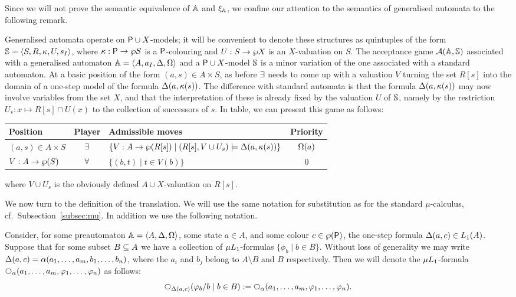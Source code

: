Since we will not prove the semantic equivalence of $\mathbb{A}$ and $\xi_{\mathbb{A}}$,
we confine our attention to the semantics of generalised automata to the
following remark.

\begin{remark}
Generalised automata operate on $\mathsf{P} \cup X$-models; it will be convenient to
denote these structures as quintuples of the form $\mathbb{S} = \langle{S,R,\kappa,U,
s_{I}}\rangle$, where $\kappa: \mathsf{P} \to \wp S$ is a $\mathsf{P}$-colouring and $U: S \to 
\wp X$ is an $X$-valuation on $S$.
The acceptance game $\mathcal{A}(\mathbb{A},\mathbb{S})$ associated with a generalised automaton
$\mathbb{A} = \langle{A,a_{I},\Delta,\Omega}\rangle$ and a $\mathsf{P} \cup X$-model $\mathbb{S}$ is a minor
variation of the one associated with a standard automaton.
At a basic position of the form $(a,s) \in A \times S$, as before $\exists$ 
needs to come up with a valuation $V$ turning the set $R[s]$ into the domain of 
a one-step model of the formula $\Delta(a,\kappa(s))$.
The difference with standard automata is that the formula $\Delta(a,\kappa(s))$
may now involve variables from the set $X$, and that the interpretation of these
is already fixed by the valuation $U$ of $\mathbb{S}$, namely by the restriction 
$U_{s}: x \mapsto R[s] \cap U(x)$ to the collection of successors of $s$.
In table, we can present this game as follows:
\begin{center}
\small
\begin{tabular}{|l|c|l|c|} \hline
Position & Player & Admissible moves & Priority \\
\hline
    $(a,s) \in A \times S$
  & $\exists$
  & $\{V : A \to \wp(R[s]) \mid (R[s],V\cup U_{s}) \models \Delta (a, \kappa(s)) \}$
  & $\Omega(a)$ 
\\
    $V : A \rightarrow \wp(S)$
  & $\forall$
  & $\{(b,t) \mid t \in V(b)\}$
  & $0$
\\ \hline
 \end{tabular}
\end{center}
where $V \cup U_{s}$ is the obviously defined $ A \cup X$-valuation on $R[s]$.
\end{remark}

We now turn to the definition of the translation.
We will use the same notation for substitution as for the standard 
$\mu$-calculus, cf.~Subsection~\ref{subsec:mu}.
In addition we use the following notation.

\begin{definition}
Consider, for some preautomaton $\mathbb{A} = \langle{A,\Delta,\Omega}\rangle$, some state $a \in
A$, and some colour $c \in \wp(\mathsf{P})$, the one-step formula $\Delta(a,c)\in 
L_{1}(A)$.
Suppose that for some subset $B \subseteq A$ we have a collection of 
$\mu L_{1}$-formulas $\{ \phi_{b} \mid b \in B \}$.
Without loss of generality we may write $\Delta(a,c) = 
\alpha(a_{1},\ldots,a_{m},b_{1},\ldots,b_{n})$, where the $a_{i}$ and $b_{j}$ 
belong to $A\setminus B$ and $B$ respectively.
Then we will denote the $\mu L_{1}$-formula 
$\nxt{\al}(a_{1},\ldots,a_{m},\phi_{1},\ldots,\phi_{n})$ as follows:
\[
\nxt{\tmap(a,c)}(\phi_{b}/b \mid b \in B)
\isdef \nxt{\al}(a_{1},\ldots,a_{m},\phi_{1},\ldots,\phi_{n}).
\]
\end{definition}

